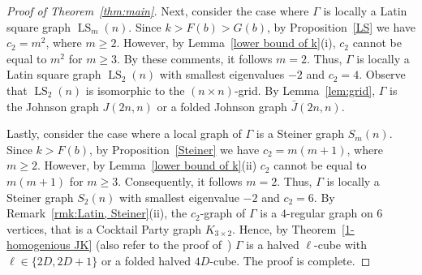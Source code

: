 \begin{proof}[Proof of Theorem~\ref{thm:main}]
Next, consider the case where $\Gamma$ is locally a Latin square graph $\operatorname{LS}_m(n)$.
Since $k > F(b) > G(b)$, by Proposition~\ref{LS} we have $c_2=m^2$, where $m\geqslant 2$.
However, by Lemma~\ref{lower bound of k}(i), $c_2$ cannot be equal to $m^2$ for $m\geqslant 3$.
By these comments, it follows $m=2$.
Thus, $\Gamma$ is locally a Latin square graph $\operatorname{LS}_2(n)$ with smallest eigenvalues $-2$ and $c_2=4$.
Observe that $\operatorname{LS}_2(n)$ is isomorphic to the $(n \times n)$-grid.
By Lemma~\ref{lem:grid}, $\Gamma$ is the Johnson graph $J(2n,n)$ or a folded Johnson graph $\bar{J}(2n,n)$.

Lastly, consider the case where a local graph of $\Gamma$ is a Steiner graph $S_m(n)$.
Since $k > F(b)$, by Proposition~\ref{Steiner} we have $c_2=m(m+1)$, where $m\geqslant 2$.
However, by Lemma~\ref{lower bound of k}(ii) $c_2$ cannot be equal to $m(m+1)$ for $m\geqslant 3$.
Consequently, it follows $m=2$.
Thus, $\Gamma$ is locally a Steiner graph $S_2(n)$ with smallest eigenvalue $-2$ and $c_2 = 6$.
By Remark~\ref{rmk:Latin, Steiner}(ii), the $c_2$-graph of $\Gamma$ is a $4$-regular graph on $6$ vertices, that is a Cocktail Party graph $K_{3\times2}$. 
Hence, by Theorem~\ref{1-homogenious JK} (also refer to the proof of~\cite[Theorem 5.3]{JK2003}) $\Gamma$ is a halved $\ell$-cube with $\ell \in \{2D,2D+1\}$ or a folded halved $4D$-cube.
The proof is complete.
\end{proof}

